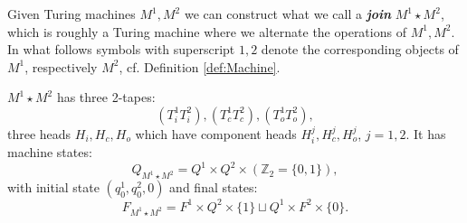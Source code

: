 \documentclass{amsart}  %
\numberwithin{equation}{section}
\theoremstyle{definition}
\theoremstyle{remark}
\begin{document}
{Given Turing machines $M ^{1}, M ^{2}  $ we can construct what we call a \textbf{\emph{join}} $M ^{1} \star M ^{2}  $, which is roughly  a Turing machine where we alternate the operations of $M ^{1}, M  ^{2}  $. In what follows symbols with superscript $1,2$ denote the corresponding objects of $M ^{1} $, respectively $M ^{2} $, cf. Definition \ref{def:Machine}. 


$M ^{1} \star M ^{2}  $ has three 2-tapes: $$(T ^{{1} } _{i}  T ^{{2} } _{i}),    (T ^{{1} } _{c}  T ^{{2} } _{c}  ), (T ^{{1} } _{o}  T ^{2}  _{o} ),   $$ three heads $H _{i}, H _{c}, H _{o}   $ which have component heads $H ^{j} _{i}, H ^{j} _{c}, H ^{j} _{o}      $, $j=1,2$. It has machine states: $$Q _{M ^{1} \star M ^{2}  }   = Q ^{1} \times Q ^{2} \times (\mathbb{Z}_{2} = \{0,1\}),  $$ with initial state $(q _{0} ^{1}, q _{0} ^{2},0)$ and final states:
$$F _{M ^{1} \star M ^{2}  } = F ^{1} \times Q ^{2} \times \{1\} \sqcup Q ^{1} \times F ^{2} \times \{0\}.  $$

}
\end{document}
